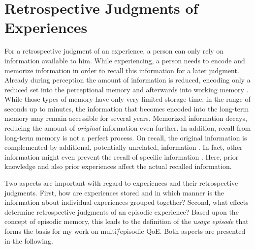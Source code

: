 \section{Retrospective Judgments of Experiences}\label{chap:03}
For a retrospective judgment of an experience, a person can only rely on information available to him.
While experiencing, a person needs to encode and memorize information in order to recall this information for a later judgment.
Already during perception the amount of information is reduced, encoding only a reduced set into the perceptional memory and afterwards into working memory \citep[][p.~8f.]{raake_speech_2006}.
While those types of memory have only very limited storage time, in the range of seconds up to minutes, the information that becomes encoded into the long-term memory may remain accessible for several years.
Memorized information decays, reducing the amount of \emph{original} information even further.
In addition, recall from long-term memory is not a perfect process.
On recall, the original information is complemented by additional, potentially unrelated, information \citep[\cf,][]{schacter_seven_2003}.
In fact, other information might even prevent the recall of specific information \citep[\cf,][]{schacter_seven_2003}.
Here, prior knowledge and also prior experiences affect the actual recalled information.

Two aspects are important with regard to experiences and their retrospective judgments.
First, how are experiences stored and in which manner is the information about individual experiences grouped together?
Second, what effects determine retrospective judgments of an episodic experience?
Based upon the concept of episodic memory, this leads to the definition of the \emph{usage episode} that forms the basis for my work on multi\=/episodic \ac{QoE}.
Both aspects are presented in the following.

